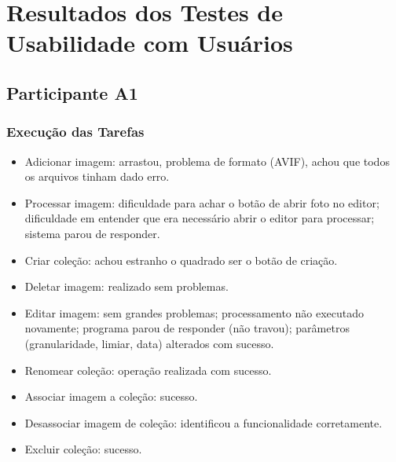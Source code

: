 \chapter{Resultados dos Testes de Usabilidade com Usuários}

\section*{Participante A1}

\subsection*{Execução das Tarefas}
\begin{itemize}
    \item Adicionar imagem: arrastou, problema de formato (AVIF), achou que todos os arquivos tinham dado erro.
    \item Processar imagem: dificuldade para achar o botão de abrir foto no editor; dificuldade em entender que era necessário abrir o editor para processar; sistema parou de responder.
    \item Criar coleção: achou estranho o quadrado ser o botão de criação.
    \item Deletar imagem: realizado sem problemas.
    \item Editar imagem: sem grandes problemas; processamento não executado novamente; programa parou de responder (não travou); parâmetros (granularidade, limiar, data) alterados com sucesso.
    \item Renomear coleção: operação realizada com sucesso.
    \item Associar imagem a coleção: sucesso.
    \item Desassociar imagem de coleção: identificou a funcionalidade corretamente.
    \item Excluir coleção: sucesso.
\end{itemize}

\newpage

